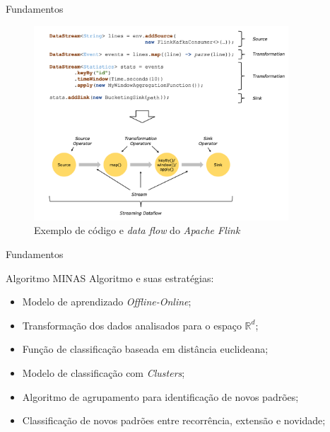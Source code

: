 \documentclass[aspectratio=43,10pt]{beamer}
\newcommand{\nota}[1]{\hspace*{-0.5cm}\textit{{\color[rgb]{1,0,0}Nota: #1}}}
\begin{document}
\begin{frame}[fragile]{Fundamentos}
\begin{figure}[ht]
\centering
\includegraphics[width=0.85\textwidth]{figuras/dataflow-code-flink.png}
\caption{Exemplo de código e \emph{data flow} do \emph{Apache Flink} \cite{ApacheFlink2020}}
\label{fig:dataflow-flink}
\end{figure}
\end{frame}

\begin{frame}[fragile]{Fundamentos}
\begin{alertblock}{Algoritmo MINAS}
  \vspace{5mm}
  Algoritmo e suas estratégias:
  \begin{itemize}
    \item Modelo de aprendizado \emph{Offline-Online};
    \item Transformação dos dados analisados para o espaço $\mathbb{R}^d$;
    \item Função de classificação baseada em distância euclideana;
    \item Modelo de classificação com \emph{Clusters};
    \item Algoritmo de agrupamento para identificação de novos padrões;
    \item Classificação de novos padrões entre recorrência, extensão e novidade;
  \end{itemize}
\end{alertblock}
\end{frame}
\end{document}
